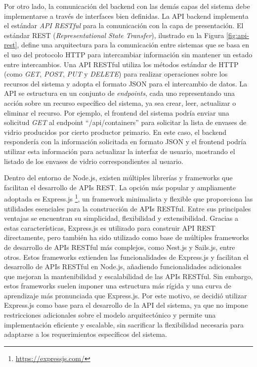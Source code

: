 Por otro lado, la comunicación del backend con las demás capas del sistema debe implementarse a través de interfaces bien definidas. La API backend implementa el estándar \textit{API RESTful} para la comunicación con la capa de presentación. El estándar REST (\textit{Representational State Transfer}), ilustrado en la Figura \ref{fig:api-rest}, define una arquitectura para la comunicación entre sistemas que se basa en el uso del protocolo HTTP para intercambiar información sin mantener un estado entre intercambios. Una API RESTful utiliza los métodos estándar de HTTP (como \textit{GET}, \textit{POST}, \textit{PUT} y \textit{DELETE}) para realizar operaciones sobre los recursos del sistema y adopta el formato JSON para el intercambio de datos. La API se estructura en un conjunto de \textit{endpoints}, cada uno representando una acción sobre un recurso específico del sistema, ya sea crear, leer, actualizar o eliminar el recurso. Por ejemplo, el frontend del sistema podría enviar una solicitud \textit{GET} al endpoint ``/api/containers'' para solicitar la lista de envases de vidrio producidos por cierto productor primario. En este caso, el backend respondería con la información solicitada en formato JSON y el frontend podría utilizar esta información para actualizar la interfaz de usuario, mostrando el listado de los envases de vidrio correspondientes al usuario.

Dentro del entorno de Node.js, existen múltiples librerías y frameworks que facilitan el desarrollo de APIs REST. La opción más popular y ampliamente adoptada es Express.js \footnote{\url{https://expressjs.com/}}, un framework minimalista y flexible que proporciona las utilidades esenciales para la construcción de APIs RESTful. Entre sus principales ventajas se encuentran su simplicidad, flexibilidad y extensibilidad. Gracias a estas características, Express.js es utilizado para construir API REST directamente, pero también ha sido utilizado como base de múltiples frameworks de desarrollo de APIs RESTful más complejos, como Nest.js y Sails.js, entre otros. Estos frameworks extienden las funcionalidades de Express.js y facilitan el desarrollo de APIs RESTful en Node.js, añadiendo funcionalidades adicionales que mejoran la mantenibilidad y escalabilidad de las APIs RESTful. Sin embargo, estos frameworks suelen imponer una estructura más rígida y una curva de aprendizaje más pronunciada que Express.js. Por este motivo, se decidió utilizar Express.js como base para el desarrollo de la API del sistema, ya que no impone restricciones adicionales sobre el modelo arquitectónico y permite una implementación eficiente y escalable, sin sacrificar la flexibilidad necesaria para adaptarse a los requerimientos específicos del sistema.

